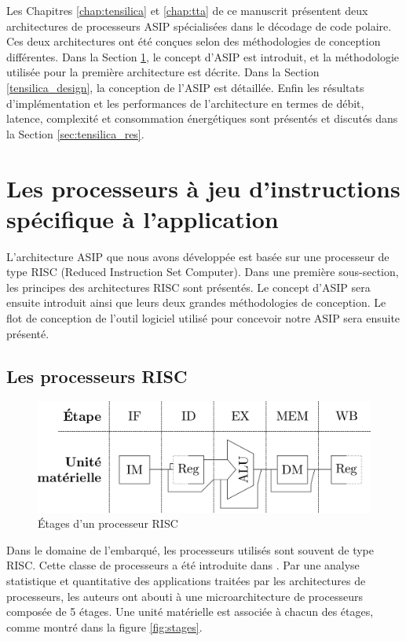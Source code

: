 Les Chapitres \ref{chap:tensilica} et \ref{chap:tta} de ce manuscrit présentent deux architectures de processeurs ASIP spécialisées dans le décodage de code polaire. Ces deux architectures ont été conçues selon des méthodologies de conception différentes. Dans la Section \ref{sec:asips}, le concept d'ASIP est introduit, et la méthodologie utilisée pour la première architecture est décrite. Dans la Section \ref{tensilica_design}, la conception de l'ASIP est détaillée. Enfin les résultats d'implémentation et les performances de l'architecture en termes de débit, latence, complexité et consommation énergétiques sont présentés et discutés dans la Section \ref{sec:tensilica_res}.


\section{Les processeurs à jeu d'instructions spécifique à l'application}
\label{sec:asips}

L'architecture ASIP que nous avons développée est basée sur une processeur de type RISC (Reduced Instruction Set Computer). Dans une première sous-section, les principes des architectures RISC sont présentés. Le concept d'ASIP sera ensuite introduit ainsi que leurs deux grandes méthodologies de conception. Le flot de conception de l'outil logiciel utilisé pour concevoir notre ASIP sera ensuite présenté.

\subsection{Les processeurs RISC}
\label{subsec:risc}
\begin{figure}[t]
\centering
\includegraphics[width=\textwidth]{main/ch3_fig/stages}
\caption{\'Etages d'un processeur RISC}
\label{fig:risc}
\end{figure}

Dans le domaine de l'embarqué, les processeurs utilisés sont souvent de type RISC. Cette classe de processeurs a été introduite dans \cite{hennessy2011computer}. Par une analyse statistique et quantitative des applications traitées par les architectures de processeurs, les auteurs ont abouti à une microarchitecture de processeurs composée de 5 étages. Une unité matérielle est associée à chacun des étages, comme montré dans la figure \ref{fig:stages}.

